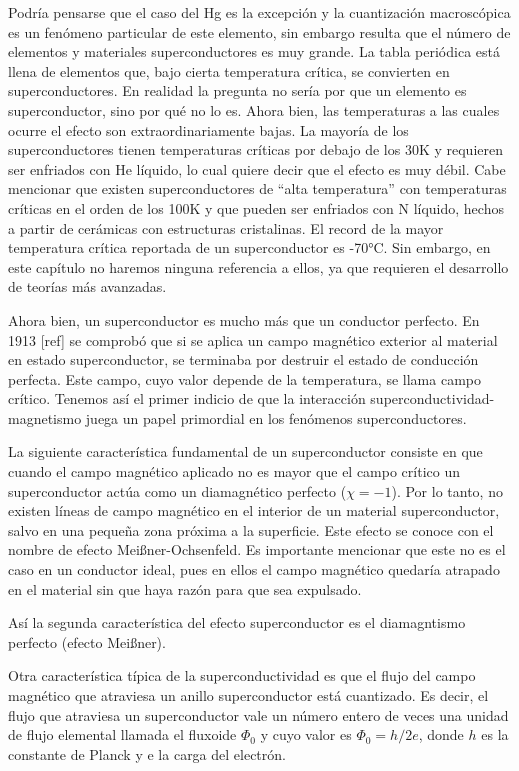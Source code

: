Podría pensarse que el caso del Hg es la excepción y la cuantización macroscópica es un fenómeno particular de este elemento, sin embargo resulta que el número de elementos y materiales superconductores es muy grande. La tabla periódica está llena de elementos que, bajo cierta temperatura crítica, se convierten en superconductores. En realidad la pregunta no sería por que un elemento es superconductor, sino por qué no lo es. Ahora bien, las temperaturas a las cuales ocurre el efecto son extraordinariamente bajas. La mayoría de los superconductores tienen temperaturas críticas por debajo de los 30K y requieren ser enfriados con He líquido, lo cual quiere decir que el efecto es muy débil. Cabe mencionar que existen superconductores de ``alta temperatura'' con temperaturas críticas en el orden de los 100K y que pueden ser enfriados con N líquido, hechos a partir de cerámicas con estructuras cristalinas. El record de la mayor temperatura crítica reportada de un superconductor es -70°C\cite{drozdov}. Sin embargo, en este capítulo no haremos ninguna referencia a ellos, ya que requieren el desarrollo de teorías más avanzadas.

Ahora bien, un superconductor es mucho más que un conductor perfecto. En 1913 [ref] se comprobó que si se aplica un campo magnético exterior al material en estado superconductor, se terminaba por destruir el estado de conducción perfecta. Este campo, cuyo valor depende de la temperatura, se llama campo crítico. Tenemos así el primer indicio de que la interacción superconductividad-magnetismo juega un papel primordial en los fenómenos superconductores.

La siguiente característica fundamental de un superconductor consiste en que cuando el campo magnético aplicado no es mayor que el campo  crítico un superconductor actúa como un diamagnético perfecto ($\chi = -1$). Por lo tanto, no existen líneas de campo magnético en el interior de un material superconductor, salvo en una pequeña zona próxima a la superficie. Este efecto se conoce con el nombre de efecto Meißner-Ochsenfeld. Es importante mencionar que este no es el caso en un conductor ideal, pues en ellos el campo magnético quedaría atrapado en el material sin que haya razón para que sea expulsado.

Así la segunda característica del efecto superconductor es el diamagntismo perfecto (efecto Meißner).

Otra característica típica de la superconductividad es que el flujo del campo magnético que atraviesa un anillo superconductor está cuantizado. Es decir, el flujo que atraviesa un superconductor vale un número entero de veces una unidad de flujo elemental llamada el fluxoide $\Phi_0$ y cuyo valor es $\Phi_0 = h /2 e$, donde $h$ es la constante de Planck y e la carga del electrón.

